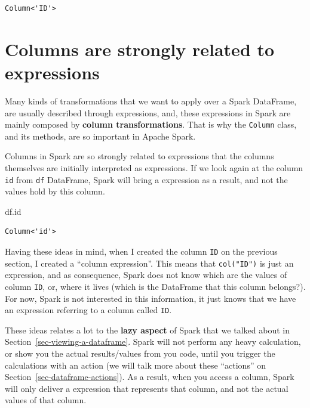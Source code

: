 \documentclass[
  11pt,
  letterpaper,
  DIV=11,
  numbers=noendperiod]{scrreprt}
\newenvironment{Shaded}{\begin{snugshade}}{\end{snugshade}}
\newcommand{\BuiltInTok}[1]{\textcolor[rgb]{0.00,0.23,0.31}{#1}}
\newcommand{\NormalTok}[1]{\textcolor[rgb]{0.00,0.23,0.31}{#1}}
\begin{document}
\begin{verbatim}
Column<'ID'>
\end{verbatim}

\section{Columns are strongly related to
expressions}\label{sec-columns-related-expressions}

Many kinds of transformations that we want to apply over a Spark
DataFrame, are usually described through expressions, and, these
expressions in Spark are mainly composed by \textbf{column
transformations}. That is why the \texttt{Column} class, and its
methods, are so important in Apache Spark.

Columns in Spark are so strongly related to expressions that the columns
themselves are initially interpreted as expressions. If we look again at
the column \texttt{id} from \texttt{df} DataFrame, Spark will bring a
expression as a result, and not the values hold by this column.

\begin{Shaded}
\begin{Highlighting}[]
\NormalTok{df.}\BuiltInTok{id}
\end{Highlighting}
\end{Shaded}

\begin{verbatim}
Column<'id'>
\end{verbatim}

Having these ideas in mind, when I created the column \texttt{ID} on the
previous section, I created a ``column expression''. This means that
\texttt{col("ID")} is just an expression, and as consequence, Spark does
not know which are the values of column \texttt{ID}, or, where it lives
(which is the DataFrame that this column belongs?). For now, Spark is
not interested in this information, it just knows that we have an
expression referring to a column called \texttt{ID}.

These ideas relates a lot to the \textbf{lazy aspect} of Spark that we
talked about in Section~\ref{sec-viewing-a-dataframe}. Spark will not
perform any heavy calculation, or show you the actual results/values
from you code, until you trigger the calculations with an action (we
will talk more about these ``actions'' on
Section~\ref{sec-dataframe-actions}). As a result, when you access a
column, Spark will only deliver a expression that represents that
column, and not the actual values of that column.
\end{document}

